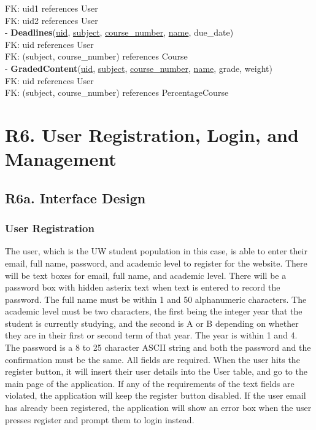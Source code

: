 \documentclass[12pt, a4paper]{article}
\begin{document}
FK: uid1 references User\\
FK: uid2 references User\\
- \textbf{Deadlines}(\underline{uid}, \underline{subject}, \underline{course\_number}, \underline{name}, due\_date)\\
FK: uid references User\\
FK: (subject, course\_number) references Course\\
- \textbf{GradedContent}(\underline{uid}, \underline{subject}, \underline{course\_number}, \underline{name}, grade, weight)\\
FK: uid references User\\
FK: (subject, course\_number) references PercentageCourse\\

\section*{R6. User Registration, Login, and Management}
\label{sec:R6}
\subsection*{R6a. Interface Design}
\subsubsection*{User Registration}
The user, which is the UW student population in this case, is able to enter their email, full name, password, and academic level to register for the website. There will be text boxes for email, full name, and academic level. There will be a password box with hidden asterix text when text is entered to record the password. The full name must be within 1 and 50 alphanumeric characters. The academic level must be two characters, the first being the integer year that the student is currently studying, and the second is A or B depending on whether they are in their first or second term of that year. The year is within 1 and 4. The password is a 8 to 25 character ASCII string and both the password and the confirmation must be the same. All fields are required. When the user hits the register button, it will insert their user details into the User table, and go to the main page of the application. If any of the requirements of the text fields are violated, the application will keep the register button disabled. If the user email has already been registered, the application will show an error box when the user presses register and prompt them to login instead.
\end{document}
